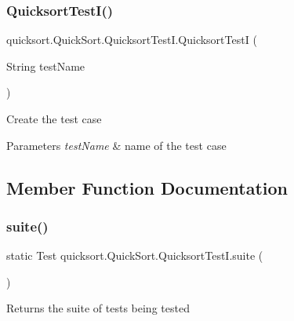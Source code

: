 \subsubsection{\texorpdfstring{Quicksort\+Test\+I()}{QuicksortTestI()}}
{\footnotesize\ttfamily quicksort.\+Quick\+Sort.\+Quicksort\+Test\+I.\+Quicksort\+TestI (\begin{DoxyParamCaption}\item[{String}]{test\+Name }\end{DoxyParamCaption})}

Create the test case


\begin{DoxyParams}{Parameters}
{\em test\+Name} & name of the test case \\
\hline
\end{DoxyParams}


\subsection{Member Function Documentation}
\hypertarget{classquicksort_1_1_quick_sort_1_1_quicksort_test_i_a6df0165d435083a8a99518679e0b9b7c}{}\label{classquicksort_1_1_quick_sort_1_1_quicksort_test_i_a6df0165d435083a8a99518679e0b9b7c} 
\subsubsection{\texorpdfstring{suite()}{suite()}}
{\footnotesize\ttfamily static Test quicksort.\+Quick\+Sort.\+Quicksort\+Test\+I.\+suite (\begin{DoxyParamCaption}{ }\end{DoxyParamCaption})\hspace{0.3cm}{\ttfamily [static]}}

\begin{DoxyReturn}{Returns}
the suite of tests being tested 
\end{DoxyReturn}
\hypertarget{classquicksort_1_1_quick_sort_1_1_quicksort_test_i_ae59d12ab37b2b52a18cec8a181080220}{}\label{classquicksort_1_1_quick_sort_1_1_quicksort_test_i_ae59d12ab37b2b52a18cec8a181080220} 
